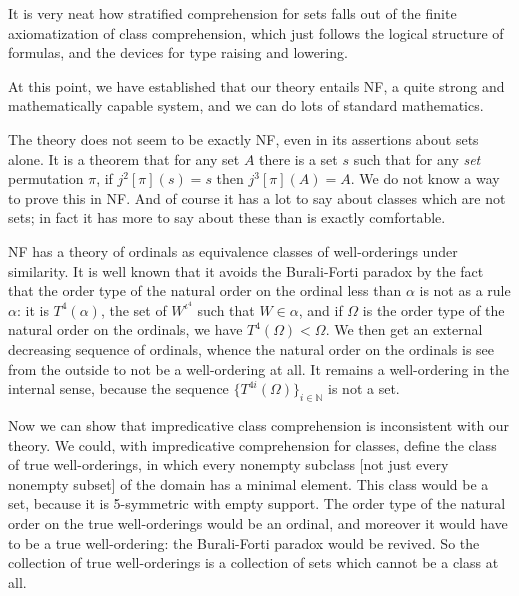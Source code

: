 \documentclass[12pt]{article}
\begin{document}
It is very neat how stratified comprehension for sets falls out of the finite axiomatization of class comprehension, which just follows the logical structure of formulas, and the devices for type raising and lowering.

At this point, we have established that our theory entails NF, a quite strong and mathematically capable system, and we can do lots of standard mathematics.

The theory does not seem to be exactly NF, even in its assertions about sets alone.  It is a theorem that for any set $A$ there
is a set $s$ such that for any {\em set\/}  permutation $\pi$, if $j^2[\pi](s) = s$ then $j^3[\pi](A)=A$.  We do not know a way to prove this in NF.  And of course it has a lot to say about classes which are not sets;  in fact it has more to say about these than is exactly comfortable.

NF has a theory of ordinals as equivalence classes of well-orderings under similarity.  It is well known that it avoids the Burali-Forti paradox by the fact that the order type of the natural order on the ordinal less than $\alpha$ is not as a rule $\alpha$:  it is
$T^4(\alpha)$, the set of $W^{\iota^4}$ such that $W \in \alpha$, and if $\Omega$ is the order type of the natural order on the ordinals, we have $T^4(\Omega)<\Omega$.  We then get an external decreasing sequence of ordinals,  whence the natural order on the ordinals is see
from the outside to not be a well-ordering at all.  It remains a well-ordering in the internal sense, because the sequence $\{T^{4i}(\Omega)\}_{i \in {\mathbb N}}$ is not a set.

Now we can show that impredicative class comprehension is inconsistent with our theory.  We could, with impredicative comprehension for classes, define the class of true well-orderings, in which every nonempty subclass [not just every nonempty subset] of the domain has a minimal element.  This class would be a set, because it is 5-symmetric with empty support.  The order type of the natural order on the true well-orderings would be an ordinal, and moreover it would have to be  a true well-ordering:  the Burali-Forti paradox would be revived.  So the collection of true well-orderings is a collection of sets which cannot be a class at all.
\end{document}
